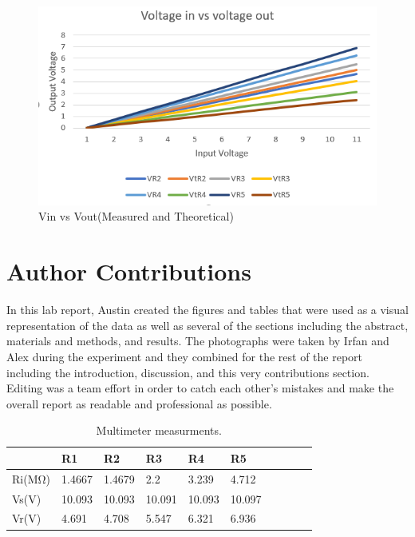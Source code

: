 \documentclass[10pt,twocolumn]{article}
\begin{document}
\begin{figure}
	\centering
	\includegraphics[width=.9\linewidth]{figures/Vin vs Vout.PNG}
	\caption{Vin vs Vout(Measured and Theoretical)}
	\label{fig:vin/out}
\end{figure}

\section{Author Contributions}

In this lab report, Austin created the figures and tables that were used as a visual representation of the data as well as several of the sections including the abstract, materials and methods, and results.
The photographs were taken by Irfan and Alex during the experiment and they combined for the rest of the report including the introduction, discussion, and this very contributions section. Editing was a team effort in order to catch each other's mistakes and make the overall report as readable and professional as possible. 

\begin{table}
	\begin{tabularx}{1\linewidth}{ lXXXXX|cXXX }
		\hline
		 & \textbf{R1} & \textbf{R2} & \textbf{R3} & \textbf{R4} & \textbf{R5}\\
		\hline
		Ri(MΩ) & 1.4667 & 1.4679 & 2.2 & 3.239 & 4.712 \\
		\cline{1-6}
		Vs(V) & 10.093 & 10.093 & 10.091 & 10.093 & 10.097 \\
		\cline{1-6}
		Vr(V) & 4.691 & 4.708 & 5.547 & 6.321 & 6.936 \\
		\hline
	\end{tabularx}
	\caption{Multimeter measurments.}
	\label{tab:Tab1}
\end{table}
\end{document}
